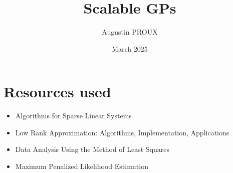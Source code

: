 \documentclass{article}
\title{Scalable GPs}
\author{Augustin PROUX}
\date{March 2025}
\begin{document}
\maketitle

\section{Resources used}
\begin{itemize}
    \item Algorithms for Sparse Linear Systems \cite{ScottTuma2023}
    \item Low Rank Approximation: Algorithms, Implementation, Applications \cite{Markovsky2012}
    \item Data Analysis Using the Method of Least Squares \cite{Wolberg2006}
    \item Maximum Penalized Likelihood Estimation \cite{EggermontLaRiccia2009}
\end{itemize}



\end{document}
